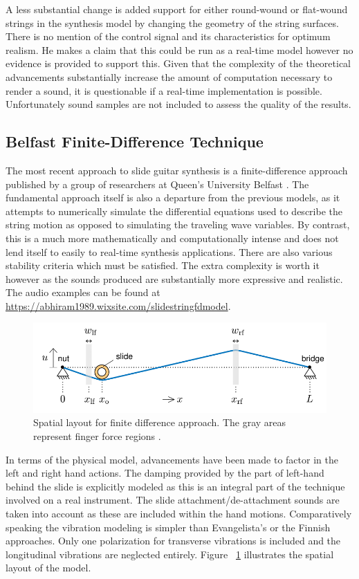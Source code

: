 \documentclass[main.tex]{subfiles}
\begin{document}
A less substantial change is added support for either round-wound or flat-wound strings in the synthesis model by changing the geometry of the string surfaces. There is no mention of the control signal and its characteristics for optimum realism. He makes a claim that this could be run as a real-time model however no evidence is provided to support this. Given that the complexity of the theoretical advancements substantially increase the amount of computation necessary to render a sound, it is questionable if a real-time implementation is possible. Unfortunately sound samples are not included to assess the quality of the results.

\subsection{Belfast Finite-Difference Technique}
The most recent approach to slide guitar synthesis is a finite-difference approach published by a group of researchers at Queen's University Belfast . The fundamental approach itself is also a departure from the previous models, as it attempts to numerically simulate the differential equations used to describe the string motion as opposed to simulating the traveling wave variables. By contrast, this is a much more mathematically and computationally intense and does not lend itself to easily to real-time synthesis applications. There are also various stability criteria which must be satisfied. The extra complexity is worth it however as the sounds produced are substantially more expressive and realistic. The audio examples can be found at \url{https://abhiram1989.wixsite.com/slidestringfdmodel}.

\begin{figure}[h]
    \centering
    \includegraphics[scale=.75]{./images/diagrams/FDModel.png}
    \caption{Spatial layout for finite difference approach. The gray areas represent finger force regions .}
    \label{fig:FDModel}
\end{figure}

In terms of the physical model, advancements have been made to factor in the left and right hand actions. The damping provided by the part of left-hand behind the slide is explicitly modeled as this is an integral part of the technique involved on a real instrument. The slide attachment/de-attachment sounds are taken into account as these are included within the hand motions. Comparatively speaking the vibration modeling is simpler than Evangelista's or the Finnish approaches. Only one polarization for transverse vibrations is included and the longitudinal vibrations are neglected entirely. Figure~ \ref{fig:FDModel} illustrates the spatial layout of the model.
\end{document}
